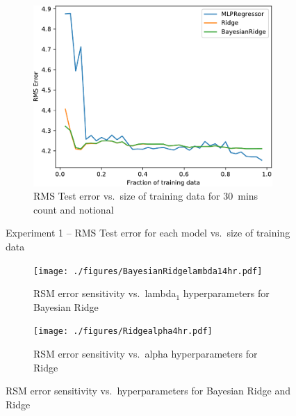 \begin{figure}[!ht]
\begin{subfigure}[t]{.47\linewidth}
        \includegraphics[width=0.9\linewidth]{./figures/AplotC8.pdf}
        \caption{RMS Test error vs.~size of training data for 30~mins count and notional}\label{AppAplotC8}
    \end{subfigure}
        \caption{Experiment 1 -- RMS Test error for each model vs.~size of training data}\label{App:Exp1_plots3}
\end{figure}

\clearpage
\begin{figure}[!t]\centering
    \begin{subfigure}[t]{.475\linewidth}\centering
        \texttt{[image: ./figures/BayesianRidgelambda14hr.pdf]}
        \caption{RSM error sensitivity vs.~lambda$_1$ hyperparameters for Bayesian Ridge }\label{App:A4a}
    \end{subfigure}\hfill%
    \begin{subfigure}[t]{.475\linewidth}\centering
        \texttt{[image: ./figures/Ridgealpha4hr.pdf]}
        \caption{RSM error sensitivity vs.~alpha hyperparameters for Ridge}\label{App:A4b}
    \end{subfigure}
        \caption{RSM error sensitivity vs.~hyperparameters for Bayesian Ridge and Ridge}\label{App:A4}
\end{figure}
\vfill
\strut